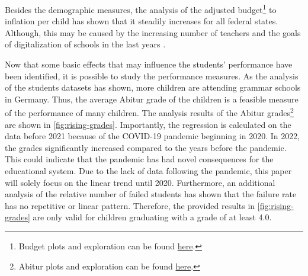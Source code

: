 
Besides the demographic measures, the analysis of the adjusted budget\footnote{\label{footnote:budget}Budget plots and exploration can be found \href{https://github.com/KarylReyne/DataLiteracyWS23/blob/main/exp/TF-007-SchoolBudgets.ipynb}{here}.} to inflation per child has shown that it steadily increases for all federal states. Although, this may be caused by the increasing number of teachers and the goals of digitalization of schools in the last years \cite{cone_pandemic_2022}.

Now that some basic effects that may influence the students' performance have been identified, it is possible to study the performance measures. As the analysis of the students datasets has shown, more children are attending grammar schools in Germany. Thus, the average Abitur grade of the children is a feasible measure of the performance of many children. The analysis results of the Abitur grades\footnote{\label{footnote:abi}Abitur plots and exploration can be found \href{https://github.com/KarylReyne/DataLiteracyWS23/blob/main/exp/TF-001-ExploreABIGrades.ipynb}{here}.} are shown in \autoref{fig:rising-grades}. Importantly, the regression is calculated on the data before 2021 because of the COVID-19 pandemic beginning in 2020. In 2022, the grades significantly increased compared to the years before the pandemic. This could indicate that the pandemic has had novel consequences for the educational system. Due to the lack of data following the pandemic, this paper will solely focus on the linear trend until 2020. Furthermore, an additional analysis of the relative number of failed students has shown that the failure rate has no repetitive or linear pattern. Therefore, the provided results in \autoref{fig:rising-grades} are only valid for children graduating with a grade of at least 4.0.

